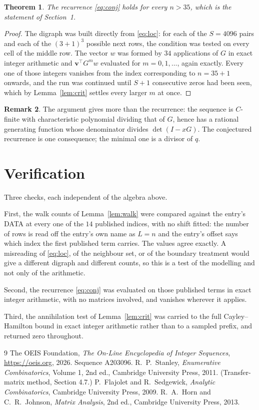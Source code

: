 \documentclass[11pt,a4paper]{article}
\theoremstyle{plain}
\newtheorem{theorem}{Theorem}
\theoremstyle{definition}
\newtheorem{remark}[theorem]{Remark}
\begin{document}
\begin{theorem}
The recurrence \eqref{eq:conj} holds for every $n>35$, which is the statement of
Section~1.
\end{theorem}

\begin{proof}
The digraph was built directly from \eqref{eq:loc}: for each of the $S=4096$ pairs and each
of the $(3+1)^{3}$ possible next rows, the condition was tested on every cell of
the middle row. The vector $w$ was formed by $34$ applications of $G$ in exact integer
arithmetic and $\mathbf{v}^{\!\top}G^{m}w$ evaluated for $m=0,1,\dots$, again exactly.
Every one of those integers vanishes from the index corresponding to $n=35+1$ onwards,
and the run was continued until $S+1$ consecutive zeros had been seen, which by
Lemma~\ref{lem:crit} settles every larger $m$ at once.
\end{proof}

\begin{remark}
The argument gives more than the recurrence: the sequence is $C$-finite with characteristic
polynomial dividing that of $G$, hence has a rational generating function whose denominator
divides $\det(I-xG)$. The conjectured recurrence is one consequence; the minimal one is a
divisor of $q$.
\end{remark}

\section{Verification}

Three checks, each independent of the algebra above.

First, the walk counts of Lemma~\ref{lem:walk} were compared against the entry's DATA at
every one of the $14$ published indices, with no shift fitted: the number of rows is
read off the entry's own name as $L=n$ and the entry's offset says which index the first
published term carries. The values agree exactly. A misreading of \eqref{eq:loc}, of the
neighbour set, or of the boundary treatment would give a different digraph and different
counts, so this is a test of the modelling and not only of the arithmetic.

Second, the recurrence \eqref{eq:conj} was evaluated on those published terms in exact
integer arithmetic, with no matrices involved, and vanishes wherever it applies.

Third, the annihilation test of Lemma~\ref{lem:crit} was carried to the full
Cayley--Hamilton bound in exact integer arithmetic rather than to a sampled prefix, and
returned zero throughout.

\begin{thebibliography}{9}
 The OEIS Foundation, \emph{The On-Line Encyclopedia of Integer
Sequences}, \url{https://oeis.org}, 2026. Sequence A203096.
 R.~P.~Stanley, \emph{Enumerative Combinatorics}, Volume 1, 2nd ed.,
Cambridge University Press, 2011. (Transfer-matrix method, Section 4.7.)
 P.~Flajolet and R.~Sedgewick, \emph{Analytic Combinatorics}, Cambridge
University Press, 2009.
 R.~A.~Horn and C.~R.~Johnson, \emph{Matrix Analysis}, 2nd ed., Cambridge
University Press, 2013.
\end{thebibliography}
\end{document}
